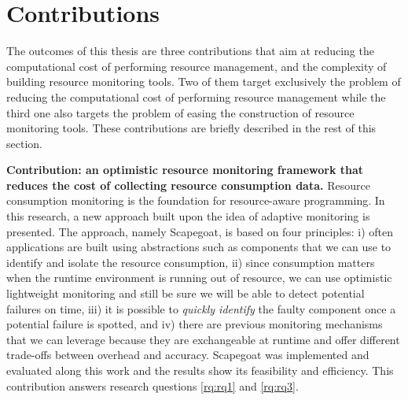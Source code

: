 \section{Contributions}

The outcomes of this thesis are three contributions that aim at reducing the computational cost of performing resource management, and the complexity of building resource monitoring tools.
Two of them target exclusively the problem of reducing the computational cost of performing resource management while the third one also targets the problem of easing the construction of resource monitoring tools. 
These contributions are briefly described in the rest of this section.

\textbf{Contribution: an optimistic resource monitoring framework that reduces the cost of collecting resource consumption data.}
Resource consumption monitoring is the foundation for resource-aware programming.
In this research, a new approach built upon the idea of adaptive monitoring is presented.
The approach, namely Scapegoat, is based on four principles: i) often applications are built using abstractions such as components that we can use to identify and isolate the resource consumption, ii) since consumption matters when the runtime environment is running out
of resource, we can use optimistic lightweight monitoring and still be sure we will be able to detect potential failures on time, iii) it is possible to \textit{quickly identify} the faulty component once a potential failure is spotted, and iv) there are previous monitoring mechanisms that we can leverage because they are exchangeable at runtime and offer different trade-offs between overhead and accuracy.
Scapegoat was implemented and evaluated along this work and the results show its feasibility and efficiency.
This contribution answers research questions \ref{rq:rq1} and \ref{rq:rq3}.

